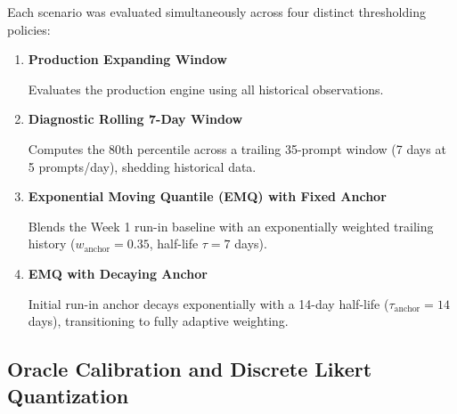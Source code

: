 \documentclass[11pt,letterpaper]{article}
\begin{document}
Each scenario was evaluated simultaneously across four distinct thresholding policies:
\begin{enumerate}
    \item \textbf{Production Expanding Window} 
    
    Evaluates the production engine using all historical observations.
    
    \item \textbf{Diagnostic Rolling 7-Day Window} 
    
    Computes the 80th percentile across a trailing 35-prompt window (7 days at 5 prompts/day), shedding historical data.
    
    \item \textbf{Exponential Moving Quantile (EMQ) with Fixed Anchor} 
    
    Blends the Week 1 run-in baseline with an exponentially weighted trailing history ($w_{\text{anchor}} = 0.35$, half-life $\tau = 7$ days).
    
    \item \textbf{EMQ with Decaying Anchor} 
    
    Initial run-in anchor decays exponentially with a 14-day half-life ($\tau_{\text{anchor}} = 14$ days), transitioning to fully adaptive weighting.
    
\end{enumerate}

\subsection{Oracle Calibration and Discrete Likert Quantization}
\end{document}

